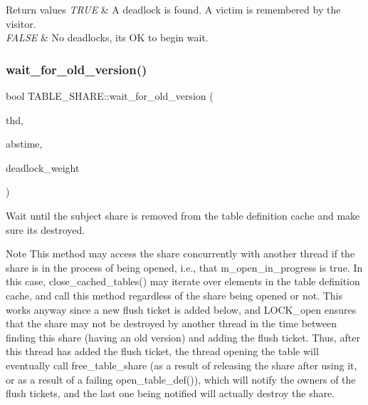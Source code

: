 \begin{DoxyRetVals}{Return values}
{\em T\+R\+UE} & A deadlock is found. A victim is remembered by the visitor. \\
\hline
{\em F\+A\+L\+SE} & No deadlocks, it\textquotesingle{}s OK to begin wait. \\
\hline
\end{DoxyRetVals}
\mbox{\label{structTABLE__SHARE_a7570f5c5956dfda8b27bef43e24492d5}} 
\subsubsection{\texorpdfstring{wait\+\_\+for\+\_\+old\+\_\+version()}{wait\_for\_old\_version()}}
{\footnotesize\ttfamily bool T\+A\+B\+L\+E\+\_\+\+S\+H\+A\+R\+E\+::wait\+\_\+for\+\_\+old\+\_\+version (\begin{DoxyParamCaption}\item[{T\+HD $\ast$}]{thd,  }\item[{struct timespec $\ast$}]{abstime,  }\item[{uint}]{deadlock\+\_\+weight }\end{DoxyParamCaption})}

Wait until the subject share is removed from the table definition cache and make sure it\textquotesingle{}s destroyed.

\begin{DoxyNote}{Note}
This method may access the share concurrently with another thread if the share is in the process of being opened, i.\+e., that m\+\_\+open\+\_\+in\+\_\+progress is true. In this case, close\+\_\+cached\+\_\+tables() may iterate over elements in the table definition cache, and call this method regardless of the share being opened or not. This works anyway since a new flush ticket is added below, and L\+O\+C\+K\+\_\+open ensures that the share may not be destroyed by another thread in the time between finding this share (having an old version) and adding the flush ticket. Thus, after this thread has added the flush ticket, the thread opening the table will eventually call free\+\_\+table\+\_\+share (as a result of releasing the share after using it, or as a result of a failing open\+\_\+table\+\_\+def()), which will notify the owners of the flush tickets, and the last one being notified will actually destroy the share.
\end{DoxyNote}

